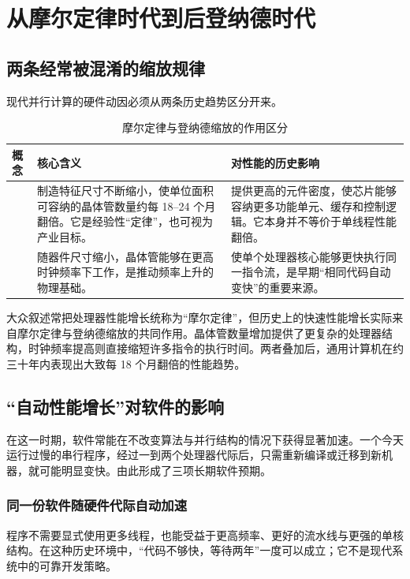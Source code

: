 \section{从摩尔定律时代到后登纳德时代}

\subsection{两条经常被混淆的缩放规律}

现代并行计算的硬件动因必须从两条历史趋势区分开来。

\begin{table}[H]
\centering
\caption{摩尔定律与登纳德缩放的作用区分}
\begin{tabularx}{\textwidth}{L{0.24\textwidth}Y Y}
\toprule
\textbf{概念} & \textbf{核心含义} & \textbf{对性能的历史影响} \\
\midrule
{} & 制造特征尺寸不断缩小，使单位面积可容纳的晶体管数量约每 18--24 个月翻倍。它是经验性“定律”，也可视为产业目标。 & 提供更高的元件密度，使芯片能够容纳更多功能单元、缓存和控制逻辑。它本身并不等价于单线程性能翻倍。 \\
 & 随器件尺寸缩小，晶体管能够在更高时钟频率下工作，是推动频率上升的物理基础。 & 使单个处理器核心能够更快执行同一指令流，是早期“相同代码自动变快”的重要来源。 \\
\bottomrule
\end{tabularx}
\end{table}

大众叙述常把处理器性能增长统称为“摩尔定律”，但历史上的快速性能增长实际来自摩尔定律与登纳德缩放的共同作用。晶体管数量增加提供了更复杂的处理器结构，时钟频率提高则直接缩短许多指令的执行时间。两者叠加后，通用计算机在约三十年内表现出大致每 18 个月翻倍的性能趋势。

\subsection{“自动性能增长”对软件的影响}

在这一时期，软件常能在不改变算法与并行结构的情况下获得显著加速。一个今天运行过慢的串行程序，经过一到两个处理器代际后，只需重新编译或迁移到新机器，就可能明显变快。由此形成了三项长期软件预期。

\subsubsection{同一份软件随硬件代际自动加速}

程序不需要显式使用更多线程，也能受益于更高频率、更好的流水线与更强的单核结构。在这种历史环境中，“代码不够快，等待两年”一度可以成立；它不是现代系统中的可靠开发策略。

